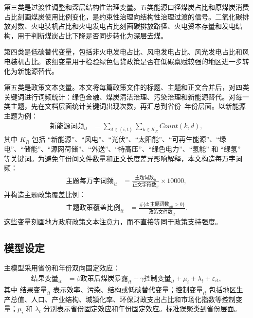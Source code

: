 \documentclass[UTF8,12pt]{ctexart}
\begin{document}
第三类是过渡性调整和深层结构性治理变量。五类能源口径煤炭占比和原煤炭消费占比刻画煤炭使用比例变化，是约束性治理向结构性治理过渡的信号。二氧化碳排放对数、火电装机占比和火电发电占比刻画碳排放路径、火电资本存量和发电结构，用于判断煤炭占比下降是否同步转化为深层去煤。

第四类是低碳替代变量，包括非火电发电占比、风电发电占比、风光发电占比和风电装机占比。该组变量用于检验绿色信贷政策是否在低碳禀赋较强的地区进一步转化为新能源替代。

第五类是政策文本变量。本文将每篇政策文件的标题、主题和正文合并后，对四类关键词进行词频统计：绿色金融、煤炭清洁治理、污染治理和新能源替代。对每一类主题，先在文档层面统计关键词出现次数，再汇总到省份--年份层面。以新能源主题为例：
\[
    \begin{aligned}
    \text{新能源词频}_{it}
    &= \sum_{d \in (i,t)}
    \sum_{k \in K_R} Count(k,d),
    \end{aligned}
\]
其中 $K_R$ 包括 ``新能源''、``风电''、``光伏''、``太阳能''、``可再生能源''、``绿电''、``储能''、``源网荷储''、``外送''、``特高压''、``绿色电力''、``氢能'' 和 ``绿氢'' 等关键词。为避免年份间文件数量和正文长度差异影响解释，本文构造每万字词频：
\[
    \begin{aligned}
    \text{主题每万字词频}_{it}
    &= \frac{\text{主题词数}_{it}}{\text{正文字符数}_{it}}
    \times 10000,
    \end{aligned}
\]
并构造主题政策覆盖比例：
\[
    \begin{aligned}
    \text{主题政策覆盖比例}_{it}
    &= \frac{\#\{d:\text{主题词数}_{idt}>0\}}
    {\text{政策文件数}_{it}}.
    \end{aligned}
\]
这些变量刻画地方政府政策文本注意力，而不直接等同于政策支持强度。

\subsection{模型设定}

主模型采用省份和年份双向固定效应：
\[
    \begin{aligned}
    \text{结果变量}_{it}
    &= \beta \text{政策后煤炭暴露}_{it}
    + \gamma \text{控制变量}_{it}
    + \mu_i + \lambda_t + \varepsilon_{it},
    \end{aligned}
\]
其中 $\text{结果变量}_{it}$ 表示效率、污染、结构或低碳替代变量；$\text{控制变量}_{it}$ 包括地区生产总值、人口、产业结构、城镇化率、环保财政支出占比和市场化指数等控制变量；$\mu_i$ 和 $\lambda_t$ 分别表示省份固定效应和年份固定效应。标准误聚类到省份层面。
\end{document}
